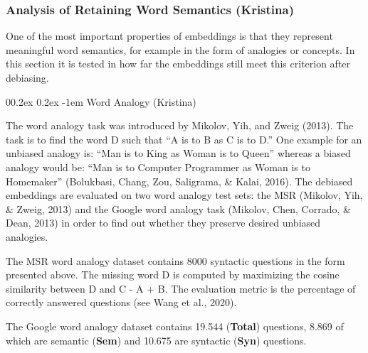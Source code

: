 \documentclass[
  english,
  man,floatsintext]{apa6}
\makeatletter
\let\oldparagraph\paragraph
\renewcommand{\paragraph}[1]{\oldparagraph{#1}\mbox{}}
\renewcommand{\paragraph}{\@startsection{paragraph}{4}{\parindent}%
  {0\baselineskip \@plus 0.2ex \@minus 0.2ex}%
  {-1em}%
  {\normalfont\normalsize\bfseries\itshape\typesectitle}}
\makeatother
\begin{document}
\hypertarget{analysis-of-retaining-word-semantics-kristina}{%
\subsubsection{Analysis of Retaining Word Semantics (Kristina)}\label{analysis-of-retaining-word-semantics-kristina}}

One of the most important properties of embeddings is that they represent meaningful word semantics, for example in the form of analogies or concepts. In this section it is tested in how far the embeddings still meet this criterion after debiasing.

\hypertarget{word-analogy-kristina}{%
\paragraph{Word Analogy (Kristina)}\label{word-analogy-kristina}}

The word analogy task was introduced by Mikolov, Yih, and Zweig (2013). The task is to find the word D such that ``A is to B as C is to D.'' One example for an unbiased analogy is: ``Man is to King as Woman is to Queen'' whereas a biased analogy would be: ``Man is to Computer Programmer as Woman is to Homemaker'' (Bolukbasi, Chang, Zou, Saligrama, \& Kalai, 2016). The debiased embeddings are evaluated on two word analogy test sets: the MSR (Mikolov, Yih, \& Zweig, 2013) and the Google word analogy task (Mikolov, Chen, Corrado, \& Dean, 2013) in order to find out whether they preserve desired unbiased analogies.

The MSR word analogy dataset contains 8000 syntactic questions in the form presented above. The missing word D is computed by maximizing the cosine similarity between D and C - A + B. The evaluation metric is the percentage of correctly answered questions (see Wang et al., 2020).

The Google word analogy dataset contains 19.544 (\textbf{Total}) questions, 8.869 of which are semantic (\textbf{Sem}) and 10.675 are syntactic (\textbf{Syn}) questions.
\end{document}
